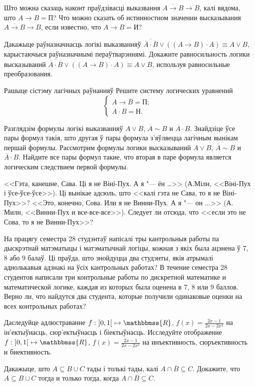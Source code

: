 \begin{problemList}

\problemItemSimple
{Што можна сказаць наконт праўдзівасці выказвання  $\overline{A \to B} \to B$, калі вядома, што $A \to B = \mbox{П}$?}
{Что можно сказать об истинностном значении высказывания $\overline{A \to B} \to B$, если известно, что $A \to B = \mbox{И}$?}

\problemItemSimple
{Дакажыце раўназначнасць логікі выказванняў $\overline{\overline{A} \cdot \overline{B}} \vee ((A \to B) \cdot A) \equiv A \vee B$, карыстаючыся раўназначнымі пераўтварэннямі.}
{Докажите равносильность логики высказываний $\overline{\overline{A} \cdot \overline{B}} \vee ((A \to B) \cdot A) \equiv A \vee B$, используя равносильные преобразования.}

\problemItemWithCommonPart
{Рашыце сістэму лагічных раўнанняў}
{Решите систему логических уравнений
{\[\begin{cases} A \to \overline{B} = \mbox{П}; \\ A \cdot B = \mbox{Н}. \end{cases}\]}}

\problemItemSimple
{Разглядзім формулы логікі выказванняў $A \vee B$, $\overline{A} \sim B$ и $\overline{A} \cdot B$. Знайдзіце ўсе пары формул такія, што другая ў пары формула з'яўляецца лагічным вынікам першай формулы.}
{Рассмотрим формулы логики высказываний $A \vee B$, $\overline{A} \sim B$ и $\overline{A} \cdot B$. Найдите все пары формул такие, что вторая в паре формула является логическим следствием первой формулы.}

\problemItemSimple
{<<Гэта, канешне, Сава. Ці я не Віні-Пух. А я "--- ён \dots>> (А.Мілн, <<Віні-Пух і ўсе-ўсе-ўсе>>). Ці вынікае адсюль, што <<калі гэта не Сава, то я не Віні-Пух>>?}
{<<Это, конечно, Сова. Или я не Винни-Пух. А я "--- он $\ldots$>> (А. Милн, <<Винни-Пух и все-все-все>>). Следует ли отсюда, что <<если это не Сова, то я не Винни-Пух>>?}

\problemItemSimple
{На працягу семестра 28 студэнтаў напісалі тры кантрольныя работы па дыскрэтнай матэматыцы і матэматычнай логіцы, кожная з якіх была ацэнена ў 7, 8 або 9 балаў. Ці праўда, што знойдуцца два студэнты, якія атрымалі аднолькавыя адзнакі на ўсіх кантрольных работах?}
{В течение семестра 28 студентов написали три контрольные работы по дискретной математике и математической логике, каждая из которых была оценена в 7, 8 или 9 баллов. Верно ли, что найдутся два студента, которые получили одинаковые оценки на всех контрольных работах?}

\problemItemSimple
{Даследуйце адлюстраванне $f:\  ]0, 1[\ \mapsto \mathbbmss{R}$, $f(x) = \frac{2 x - 1}{2 x - 2 x^2}$ на ін'ектыўнасць, сюр'ектыўнасць і біектыўнасць.}
{Исследуйте отображение $f:\  ]0, 1[\ \mapsto \mathbbmss{R}$, $f(x) = \frac{2 x - 1}{2 x - 2 x^2}$ на инъективность, сюръективность и биективность.}

\problemItemSimple
{Дакажыце, што $A \subseteq B \cup C$ тады і толькі тады, калі $A \cap \overline{B} \subseteq C$.}
{Докажите, что $A \subseteq B \cup C$ тогда и только тогда, когда $A \cap \overline{B} \subseteq C$.}

\end{problemList}

